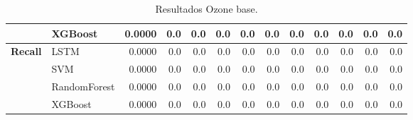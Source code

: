 \begin{table}[h]
\begin{adjustbox}{max width=11cm}
\begin{tabular}{|c|l|r|r|r|r|r|r|r|r|r|r|r|}
			& XGBoost &  0.0000 &  0.0 &  0.0 &  0.0 &  0.0 &  0.0 &  0.0 &  0.0 &  0.0 &  0.0 &  0.0 \\
			\hline
			\textbf{Recall} & LSTM &  0.0000 &  0.0 &  0.0 &  0.0 &  0.0 &  0.0 &  0.0 &  0.0 &  0.0 &  0.0 &  0.0 \\
			& SVM &  0.0000 &  0.0 &  0.0 &  0.0 &  0.0 &  0.0 &  0.0 &  0.0 &  0.0 &  0.0 &  0.0 \\
			& RandomForest &  0.0000 &  0.0 &  0.0 &  0.0 &  0.0 &  0.0 &  0.0 &  0.0 &  0.0 &  0.0 &  0.0 \\
			& XGBoost &  0.0000 &  0.0 &  0.0 &  0.0 &  0.0 &  0.0 &  0.0 &  0.0 &  0.0 &  0.0 &  0.0 \\
			\hline
		\end{tabular}
	\end{adjustbox}
	\caption{Resultados Ozone base.}
	\label{tab:Ozone_base}
\end{table}

